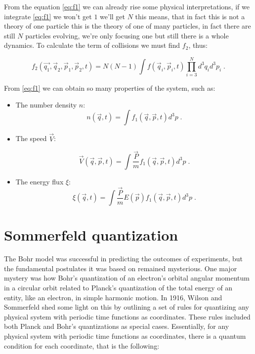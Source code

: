 \documentclass[spanish,notitlepage,letterpaper,11pt]{article} %
\numberwithin{equation}{subsection}
\begin{document}
    From the equation \ref{eq:f1} we can already rise some physical interpretations, if we integrate \ref{eq:f1} we won't get $1$ we'll get $N$ this means, that in fact this is not a theory of one particle this is the theory of one of many particles, in fact there are still $N$ particles evolving, we're only focusing one but still there is a whole dynamics. To calculate the term of collisions we must find $f_2$, thus:

    \begin{equation}
        f_2(\Vec{q_1},\Vec{q}_2,\Vec{p}_1,\Vec{p}_2,t) = N(N-1)\int f(\Vec{q}_i,\Vec{p}_i,t)\prod_{i=3}^Nd^3q_id^3p_i\;.
    \end{equation}


    From \ref{eq:f1} we can obtain so many properties of the system, such as:

    \begin{itemize}
        \item The number density $n$:
        \begin{equation}
            n(\Vec{q},t) = \int f_1(\Vec{q},\Vec{p},t)d^3p\;.
        \end{equation}

        \item The speed $\Vec{V}$:

        \begin{equation}
            \Vec{V}(\Vec{q},\Vec{p},t) = \int \frac{\Vec{P}}{m}f_1(\Vec{q},\Vec{p},t)d^3p\;.
        \end{equation}

        \item  The energy flux $\xi$:
        \begin{equation}
            \xi (\Vec{q},t) = \int \frac{\Vec{P}}{m}E(\Vec{p})f_1(\Vec{q},\Vec{p},t)d^3p\;.
        \end{equation}
    \end{itemize}


    
    \appendix
    
    \section{Sommerfeld quantization}\label{APX:Sommerfeld}

        The Bohr model was successful in predicting the outcomes of experiments, but the fundamental postulates it was based on remained mysterious. One major mystery was how Bohr's quantization of an electron's orbital angular momentum in a circular orbit related to Planck's quantization of the total energy of an entity, like an electron, in simple harmonic motion. In 1916, Wilson and Sommerfeld shed some light on this by outlining a set of rules for quantizing any physical system with periodic time functions as coordinates. These rules included both Planck and Bohr's quantizations as special cases. Essentially, for any physical system with periodic time functions as coordinates, there is a quantum condition for each coordinate, that is the following:
\end{document}
